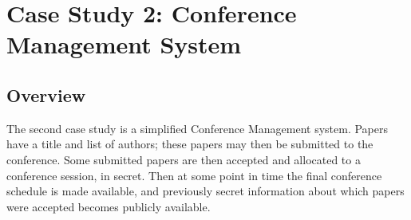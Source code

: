 \section{Case Study 2: Conference Management System}

%
%
%
%
%
%
%
%
%
%
%
%
%
%

\subsection{Overview}

The second case study is a simplified Conference Management system. Papers have a title and list of authors; these papers may then be submitted to the conference. Some submitted papers are then accepted and allocated to a conference session, in secret. Then at some point in time the final conference schedule is made available, and previously secret information about which papers were accepted becomes publicly available.

